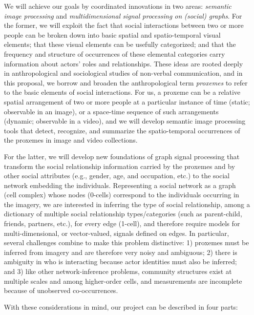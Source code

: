 We will achieve our goals by coordinated innovations in two areas: \emph{semantic image processing} and \emph{multidimensional signal processing on (social) graphs}. For the former, we will exploit the fact that social interactions between two or more people can be broken down into basic spatial and spatio-temporal visual elements; that these visual elements can be usefully categorized; and that the frequency and structure of occurrences of these elemental categories carry information about actors' roles and relationships. These ideas are rooted deeply in anthropological and sociological studies of non-verbal communication, and in this proposal, we borrow and broaden the anthropological term \emph{proxemes} to refer to the basic elements of social interactions. For us, a proxeme can be a relative spatial arrangement of two or more people at a particular instance of time (static; observable in an image), or a space-time sequence of such arrangements (dynamic; observable in a video), and we will develop semantic image processing tools that detect, recognize, and summarize the spatio-temporal occurrences of the proxemes in image and video collections.

For the latter, we will develop new foundations of graph signal processing that transform the social relationship information carried by the proxemes and by other social attributes (e.g., gender, age, and occupation, etc.) to the social network embedding the individuals. Representing a social network as a graph (cell complex) whose nodes (0-cells) correspond to the individuals occurring in the imagery, we are interested in inferring the type of social relationship, among a dictionary of multiple social relationship types/categories (such as parent-child, friends, partners, etc.), for every edge (1-cell), and therefore require models for multi-dimensional, or vector-valued, signals defined on edges. In particular, several challenges combine to make this problem distinctive: 1) proxemes must be inferred from imagery and are therefore very noisy and ambiguous; 2) there is ambiguity in who is interacting because actor identities must also be inferred; and 3) like other network-inference problems, community structures exist at multiple scales and among higher-order cells, and measurements are incomplete because of unobserved co-occurrences.


With these considerations in mind, our project can be described in four parts:


